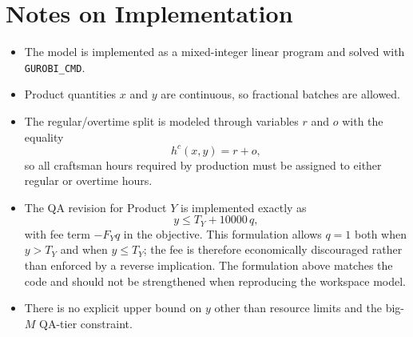 \section*{Notes on Implementation}

\begin{itemize}
    \item The model is implemented as a mixed-integer linear program and solved with \texttt{GUROBI\_CMD}.
    \item Product quantities \(x\) and \(y\) are continuous, so fractional batches are allowed.
    \item The regular/overtime split is modeled through variables \(r\) and \(o\) with the equality
    \[
    h^c(x,y)=r+o,
    \]
    so all craftsman hours required by production must be assigned to either regular or overtime hours.
    \item The QA revision for Product \(Y\) is implemented exactly as
    \[
    y \le T_Y + 10000\, q,
    \]
    with fee term \(-F_Y q\) in the objective. This formulation allows \(q=1\) both when \(y>T_Y\) and when \(y\le T_Y\); the fee is therefore economically discouraged rather than enforced by a reverse implication. The formulation above matches the code and should not be strengthened when reproducing the workspace model.
    \item There is no explicit upper bound on \(y\) other than resource limits and the big-\(M\) QA-tier constraint.
\end{itemize}
